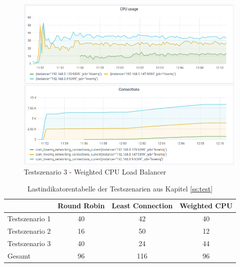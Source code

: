 \begin{figure}
    \centering
    \includegraphics[scale=0.8]{images/s3_cpu.png}
    \caption{Testszenario 3 - Weighted CPU Load Balancer}
    \label{fig:s3-cpu}
\end{figure}

\begin{table}[h!]
\centering
\renewcommand{\arraystretch}{1.5}
\begin{tabular}{|l|c|c|c|}
    \hline
    & Round Robin & Least Connection & Weighted CPU \\
    \hline
    Testszenario 1 & 40 & 42 & 40 \\
    \hline
    Testszenario 2 & 16 & 50 & 12 \\
    \hline
    Testszenario 3 & 40 & 24 & 44 \\
    \hline
    Gesamt & 96 & 116 & 96 \\
    \hline
\end{tabular}
\caption{Lastindikatorentabelle der Testszenarien aus Kapitel \ref{ss:test}}
\label{table:test-output}
\end{table}

